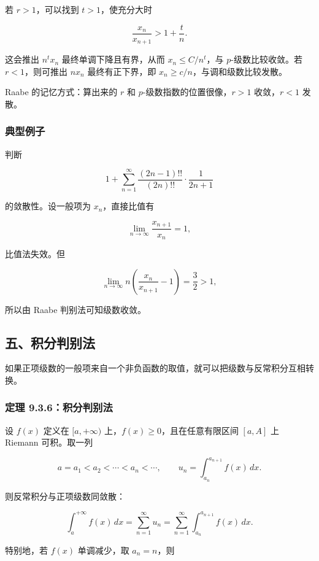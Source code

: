 若 \(r>1\)，可以找到 \(t>1\)，使充分大时

\[
      \frac{x_n}{x_{n+1}}>1+\frac{t}{n}.
    \]

这会推出 \(n^t x_n\) 最终单调下降且有界，从而 \(x_n\le C/n^t\)，与 \(p\)-级数比较收敛。若 \(r<1\)，则可推出 \(n x_n\) 最终有正下界，即 \(x_n\ge c/n\)，与调和级数比较发散。

\begin{notebox}
Raabe 的记忆方式：算出来的 \(r\) 和 \(p\)-级数指数的位置很像，\(r>1\) 收敛，\(r<1\) 发散。
\end{notebox}

\subsubsection*{典型例子}

判断

\[
      1+\sum_{n=1}^{\infty}\frac{(2n-1)!!}{(2n)!!}\cdot\frac{1}{2n+1}
    \]

的敛散性。设一般项为 \(x_n\)，直接比值有

\[
      \lim_{n\to\infty}\frac{x_{n+1}}{x_n}=1,
    \]

比值法失效。但

\[
      \lim_{n\to\infty} n\left(\frac{x_n}{x_{n+1}}-1\right)=\frac32>1,
    \]

所以由 Raabe 判别法可知级数收敛。

\subsection*{五、积分判别法}

如果正项级数的一般项来自一个非负函数的取值，就可以把级数与反常积分互相转换。

\subsubsection*{定理 9.3.6：积分判别法}

设 \(f(x)\) 定义在 \([a,+\infty)\) 上，\(f(x)\ge0\)，且在任意有限区间 \([a,A]\) 上 Riemann 可积。取一列

\[
      a=a_1<a_2<\cdots<a_n<\cdots,\qquad
      u_n=\int_{a_n}^{a_{n+1}}f(x)\,dx.
    \]

则反常积分与正项级数同敛散：

\[
      \int_a^{+\infty}f(x)\,dx
      =
      \sum_{n=1}^{\infty}u_n
      =
      \sum_{n=1}^{\infty}\int_{a_n}^{a_{n+1}}f(x)\,dx.
    \]

特别地，若 \(f(x)\) 单调减少，取 \(a_n=n\)，则


